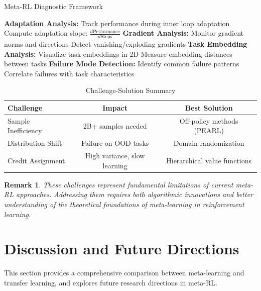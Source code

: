 \documentclass[12pt]{article}
\newtheorem{remark}{Remark}
\begin{document}
{{\begin{enumerate}
				\begin{algorithm}[H]
				\caption{Meta-RL Diagnostic Framework}
				\begin{algorithmic}[1]
				\STATE \textbf{Adaptation Analysis:}
				\STATE Track performance during inner loop adaptation
				\STATE Compute adaptation slope: $\frac{d\text{Performance}}{d\text{Steps}}$
				\STATE \textbf{Gradient Analysis:}
				\STATE Monitor gradient norms and directions
				\STATE Detect vanishing/exploding gradients
				\STATE \textbf{Task Embedding Analysis:}
				\STATE Visualize task embeddings in 2D
				\STATE Measure embedding distances between tasks
				\STATE \textbf{Failure Mode Detection:}
				\STATE Identify common failure patterns
				\STATE Correlate failures with task characteristics
				\end{algorithmic}
				\end{algorithm}
			\end{enumerate}
			
			\begin{table}[H]
			\centering
			\caption{Challenge-Solution Summary}
			\begin{tabular}{@{}lcc@{}}
			\toprule
			\textbf{Challenge} & \textbf{Impact} & \textbf{Best Solution} \\
			\midrule
			Sample Inefficiency & 2B+ samples needed & Off-policy methods (PEARL) \\
			Distribution Shift & Failure on OOD tasks & Domain randomization \\
			Credit Assignment & High variance, slow learning & Hierarchical value functions \\
			\bottomrule
			\end{tabular}
			\label{tab:challenge_solutions}
			\end{table}
			
			\begin{remark}
			These challenges represent fundamental limitations of current meta-RL approaches. Addressing them requires both algorithmic innovations and better understanding of the theoretical foundations of meta-learning in reinforcement learning.
			\end{remark}
			
			\section{Discussion and Future Directions}
			
			This section provides a comprehensive comparison between meta-learning and transfer learning, and explores future research directions in meta-RL.
			
}}
\end{document}
